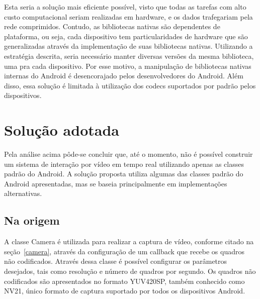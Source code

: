 \documentclass{acm_proc_article-sp}
\begin{document}
Esta seria a solução mais eficiente possível, visto que todas as tarefas com alto custo computacional seriam realizadas em hardware, e os dados trafegariam pela rede comprimidos. Contudo, as bibliotecas nativas são dependentes de plataforma, ou seja, cada dispositivo tem particularidades de hardware que são generalizadas através da implementação de suas bibliotecas nativas. Utilizando a estratégia descrita, seria necessário manter diversas versões da mesma biblioteca, uma pra cada dispositivo. Por esse motivo, a manipulação de bibliotecas nativas internas do Android é desencorajado pelos desenvolvedores do Android. Além disso, essa solução é limitada à utilização dos codecs suportados por padrão pelos dispositivos.

\section{Solução adotada}

Pela análise acima pôde-se concluir que, até o momento, não é possível construir um sistema de interação por vídeo em tempo real utilizando apenas as classes padrão do Android. A solução proposta utiliza algumas das classes padrão do Android apresentadas, mas se baseia principalmente em implementações alternativas.


\subsection{Na origem}


A classe Camera é utilizada para realizar a captura de vídeo, conforme citado na seção~\ref{camera}, através da configuração de um callback que recebe os quadros não codificados. Através dessa classe é possível configurar os parâmetros desejados, tais como resolução e número de quadros por segundo. Os quadros não codificados são apresentados no formato YUV420SP, também conhecido como NV21, único formato de captura suportado por todos os dispositivos Android.
\end{document}
